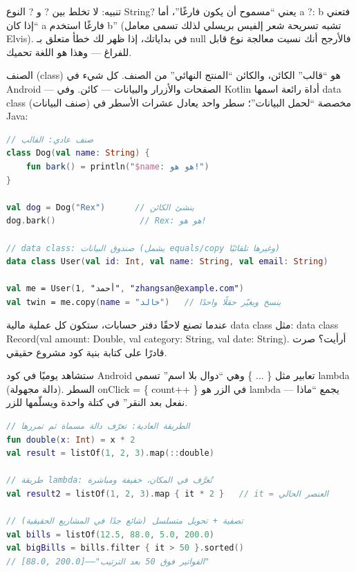 \begin{tcbwarn}{تنبيه: لا تخلط بين ? و ?}
النوع String? يعني “مسموح أن يكون فارغًا”، أما a ?: b فتعني “إذا كان a فارغًا استخدم b” (تشبه تسريحة شعر إلفيس بريسلي لذلك تسمى معامل Elvis). في بداياتك، إذا ظهر لك خطأ متعلق بـ null فالأرجح أنك نسيت معالجة نوع قابل للفراغ — وهذا هو اللغة تحميك.

\end{tcbwarn}


الصنف (class) هو “قالب” الكائن، والكائن “المنتج النهائي” من الصنف. كل شيء في Android — الصفحات والأزرار والبيانات — كائن. وفي Kotlin أداة رائعة اسمها data class (صنف البيانات) مخصصة “لحمل البيانات”؛ سطر واحد يعادل عشرات الأسطر في Java:

\begin{lstlisting}[language=Kotlin]
// صنف عادي: القالب
class Dog(val name: String) {
    fun bark() = println("$name: هو هو!")
}

val dog = Dog("Rex")      // ينشئ الكائن
dog.bark()                 // Rex: هو هو!

// data class: صندوق البيانات (يشمل equals/copy وغيرها تلقائيًا)
data class User(val id: Int, val name: String, val email: String)

val me = User(1, "أحمد", "zhangsan@example.com")
val twin = me.copy(name = "خالد")   // ينسخ ويغيّر حقلًا واحدًا
\end{lstlisting}

عندما تصنع لاحقًا دفتر حسابات، ستكون كل عملية مالية data class مثل: data class Record(val amount: Double, val category: String, val date: String). أرأيت؟ صرت قادرًا على كتابة بنية كود مشروع حقيقي.


ستشاهد يوميًا في كود Android تعابير مثل \{ ... \} وهي “دوال بلا اسم” تسمى lambda (دالة مجهولة). السطر onClick = \{ count++ \} في الزر هو lambda — يجمع “ماذا نفعل بعد النقر” في كتلة واحدة ويسلّمها للزر.

\begin{lstlisting}[language=Kotlin]
// الطريقة العادية: تعرّف دالة مسماة ثم تمررها
fun double(x: Int) = x * 2
val result = listOf(1, 2, 3).map(::double)

// طريقة lambda: تُعرَّف في المكان، خفيفة ومباشرة
val result2 = listOf(1, 2, 3).map { it * 2 }   // it = العنصر الحالي

// تصفية + تحويل متسلسل (شائع جدًا في المشاريع الحقيقية)
val bills = listOf(12.5, 88.0, 5.0, 200.0)
val bigBills = bills.filter { it > 50 }.sorted()
// [88.0, 200.0]——"الفواتير فوق 50 بعد الترتيب"
\end{lstlisting}

